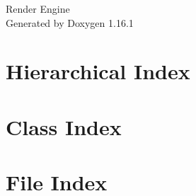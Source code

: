 \documentclass[twoside]{book}
\newcommand{\+}{\discretionary{\mbox{\scriptsize$\hookleftarrow$}}{}{}}
\newcommand{\clearemptydoublepage}{%
    \newpage{\pagestyle{empty}\cleardoublepage}%
  }
\begin{document}
  \raggedbottom
    \hypersetup{pageanchor=false,
                bookmarksnumbered=true,
                pdfencoding=unicode
               }
  \begin{titlepage}
  \vspace*{7cm}
  \begin{center}%
  {\Large Render Engine}\\
  \vspace*{1cm}
  {\large Generated by Doxygen 1.16.1}\\
  \end{center}
  \end{titlepage}
  \clearemptydoublepage
  \tableofcontents
  \clearemptydoublepage
  \hypersetup{pageanchor=true}
\chapter{Hierarchical Index}

\chapter{Class Index}

\chapter{File Index}

\end{document}
